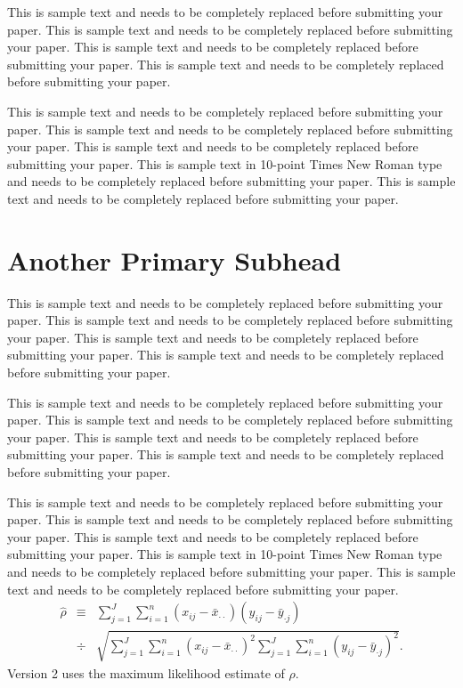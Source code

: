 \documentclass{../../tex_template/asaproc}
\begin{document}
This is sample text and needs to be completely replaced before submitting your paper. This is sample text and needs to be completely replaced before submitting your paper.  This is sample text and needs to be completely replaced before submitting your paper. This is sample text and needs to be completely replaced before submitting your paper.

This is sample text and needs to be completely replaced before submitting your paper. This is sample text and needs to be completely replaced before submitting your paper. This is sample text and needs to be completely replaced before submitting your paper. This is sample text in 10-point Times New Roman type and needs to be completely replaced before submitting your paper. This is sample text and needs to be completely replaced before submitting your paper.

\section{Another Primary Subhead}

This is sample text and needs to be completely replaced before submitting your paper. This is sample text and needs to be completely replaced before submitting your paper. This is sample text and needs to be completely replaced before submitting your paper. This is sample text and needs to be completely replaced before submitting your paper.

This is sample text and needs to be completely replaced before submitting your paper. This is sample text and needs to be completely replaced before submitting your paper.  This is sample text and needs to be completely replaced before submitting your paper. This is sample text and needs to be completely replaced before submitting your paper.

This is sample text and needs to be completely replaced before submitting your paper. This is sample text and needs to be completely replaced before submitting your paper. This is sample text and needs to be completely replaced before submitting your paper. This is sample text in 10-point Times New Roman type and needs to be completely replaced before submitting your paper. This is sample text and needs to be completely replaced before submitting your paper.\begin{eqnarray}
\hat{\rho} & \equiv & \sum_{j=1}^J
\sum_{i=1}^n (x_{ij} - \bar{x}_{\cdot \cdot})(y_{ij} - \bar{y}_{\cdot
j}) \nonumber \\
& \div & \sqrt{
\sum_{j=1}^J \sum_{i=1}^n (x_{ij} - \bar{x}_{\cdot \cdot})^2
\sum_{j=1}^J \sum_{i=1}^n (y_{ij} - \bar{y}_{\cdot j})^2
}
. \nonumber
\end{eqnarray}
Version 2 uses the maximum likelihood estimate of $\rho$.
\end{document}

